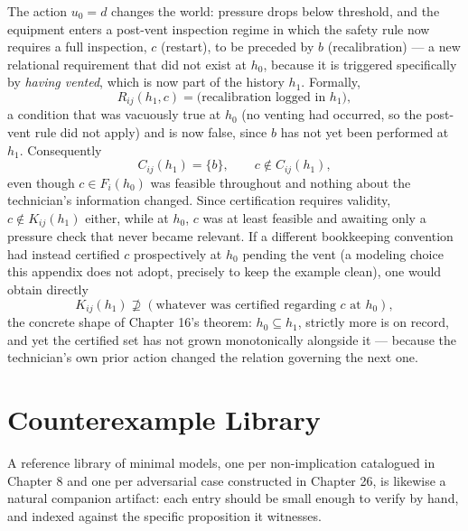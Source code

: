 \documentclass[11pt]{report}
\theoremstyle{definition}
\theoremstyle{plain}
\begin{document}
The action $u_0 = d$ changes the world: pressure drops below threshold, and the equipment enters a post-vent inspection regime in which the safety rule now requires a full inspection, $c$ (restart), to be preceded by $b$ (recalibration) --- a new relational requirement that did not exist at $h_0$, because it is triggered specifically by \emph{having vented}, which is now part of the history $h_1$. Formally,
\[
R_{ij}(h_1, c) = \big(\text{recalibration logged in } h_1\big),
\]
a condition that was vacuously true at $h_0$ (no venting had occurred, so the post-vent rule did not apply) and is now false, since $b$ has not yet been performed at $h_1$. Consequently
\[
C_{ij}(h_1) = \{b\}, \qquad c \notin C_{ij}(h_1),
\]
even though $c \in F_i(h_0)$ was feasible throughout and nothing about the technician's information changed. Since certification requires validity, $c \notin K_{ij}(h_1)$ either, while at $h_0$, $c$ was at least feasible and awaiting only a pressure check that never became relevant. If a different bookkeeping convention had instead certified $c$ prospectively at $h_0$ pending the vent (a modeling choice this appendix does not adopt, precisely to keep the example clean), one would obtain directly
\[
K_{ij}(h_1) \not\supseteq (\text{whatever was certified regarding } c \text{ at } h_0),
\]
the concrete shape of Chapter 16's theorem: $h_0 \subseteq h_1$, strictly more is on record, and yet the certified set has not grown monotonically alongside it --- because the technician's own prior action changed the relation governing the next one.

\chapter{Counterexample Library}

A reference library of minimal models, one per non-implication catalogued in Chapter 8 and one per adversarial case constructed in Chapter 26, is likewise a natural companion artifact: each entry should be small enough to verify by hand, and indexed against the specific proposition it witnesses.
\end{document}
